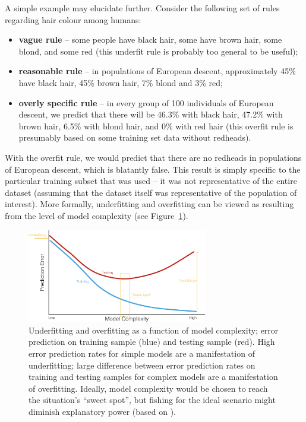 \afterpage{\FloatBarrier}
\newpage\noindent A simple example may elucidate further. Consider the following set of rules regarding hair colour among humans: 
\begin{itemize}[noitemsep]
\item \textbf{vague rule} -- some people have black hair, some have brown hair, some blond, and some red (this underfit rule is probably too general to be useful);
\item \textbf{reasonable rule} -- in populations of European descent, approximately 45\% have black hair, 45\% brown hair, 7\% blond and 3\% red;
\item \textbf{overly specific rule} -- in every group of 100 individuals of European descent, we predict that there will be 46.3\% with black hair, 47.2\% with brown hair, 6.5\% with blond hair, and 0\% with red hair (this overfit rule is presumably based on some training set data without redheads). 
\end{itemize}
With the overfit rule, we would predict that there are no redheads in populations of European descent, which is blatantly false. This result is simply specific to the particular training subset that was used -- it was not representative of the entire dataset (assuming that the dataset itself was representative of the population of interest). \newl More formally, underfitting and overfitting can be viewed as resulting from the level of model complexity (see Figure~\ref{fig:uomc}).  
\begin{figure}[!t]
\centering
\includegraphics[width=0.7\textwidth]{images/DSML/overunder.png} \caption[\small Underfitting and overfitting as a function of model complexity]{\small Underfitting and overfitting as a function of model complexity; error prediction on training sample (blue) and testing sample (red). High error prediction rates for simple models are a manifestation of underfitting; large difference between error prediction rates on training and testing samples for complex models are a manifestation of overfitting. Ideally, model complexity would be chosen to reach the situation's ``sweet spot'', but fishing for the ideal scenario might diminish explanatory power (based on \cite{DSML_HTF}).}\label{fig:uomc}
\end{figure}

